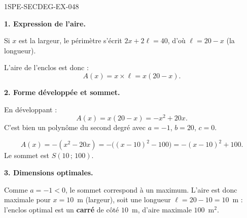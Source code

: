 \begin{corrige}{1SPE-SECDEG-EX-048}

\textbf{1. Expression de l'aire.}


Si $x$ est la largeur, le périmètre s'écrit $2x + 2\ell = 40$, d'où $\ell = 20 - x$ (la longueur).

L'aire de l'enclos est donc :
\[
A(x) = x \times \ell = x(20 - x).
\]

\medskip
\textbf{2. Forme développée et sommet.}

En développant :
\[
A(x) = x(20 - x) = -x^2 + 20x.
\]
C'est bien un polynôme du second degré avec $a = -1$, $b = 20$, $c = 0$.


\[
A(x)=-(x^2-20x)=-\bigl((x-10)^2-100\bigr)=-(x-10)^2+100.
\]
Le sommet est $S(10\,;\,100)$.

\medskip
\textbf{3. Dimensions optimales.}

Comme $a = -1 < 0$, le sommet correspond à un maximum. L'aire est donc maximale pour $x = 10$~m (largeur), soit une longueur $\ell = 20 - 10 = 10$~m : l'enclos optimal est un \textbf{carré} de côté $10$~m, d'aire maximale $100$~m$^2$.

\end{corrige}
